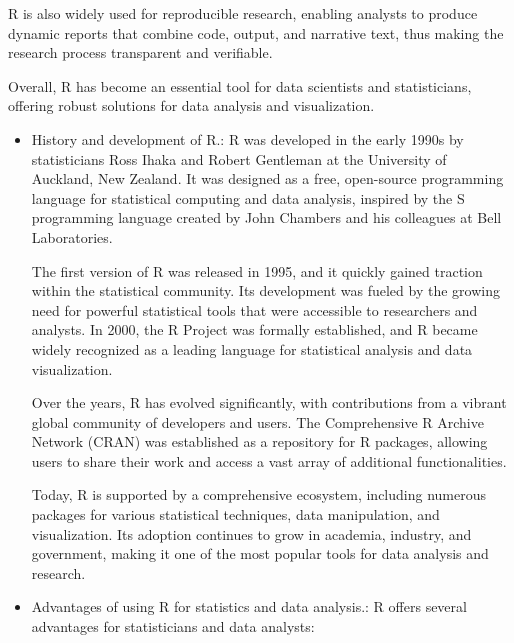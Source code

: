 \documentclass[10pt]{book}
\begin{document}
R is also widely used for reproducible research, enabling analysts to produce dynamic reports that combine code, output, and narrative text, thus making the research process transparent and verifiable. 

Overall, R has become an essential tool for data scientists and statisticians, offering robust solutions for data analysis and visualization.

\begin{itemize}
    \item History and development of R.: R was developed in the early 1990s by statisticians Ross Ihaka and Robert Gentleman at the University of Auckland, New Zealand. It was designed as a free, open-source programming language for statistical computing and data analysis, inspired by the S programming language created by John Chambers and his colleagues at Bell Laboratories.

The first version of R was released in 1995, and it quickly gained traction within the statistical community. Its development was fueled by the growing need for powerful statistical tools that were accessible to researchers and analysts. In 2000, the R Project was formally established, and R became widely recognized as a leading language for statistical analysis and data visualization.

Over the years, R has evolved significantly, with contributions from a vibrant global community of developers and users. The Comprehensive R Archive Network (CRAN) was established as a repository for R packages, allowing users to share their work and access a vast array of additional functionalities.

Today, R is supported by a comprehensive ecosystem, including numerous packages for various statistical techniques, data manipulation, and visualization. Its adoption continues to grow in academia, industry, and government, making it one of the most popular tools for data analysis and research. 

    \item Advantages of using R for statistics and data analysis.: R offers several advantages for statisticians and data analysts:


\end{itemize}
\end{document}
